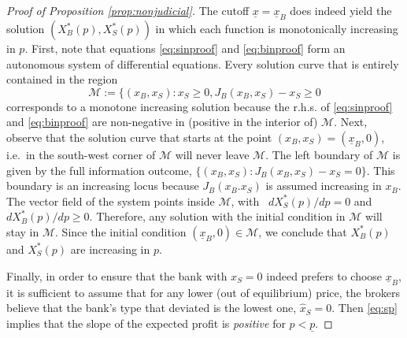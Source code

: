 \documentclass[11pt,twopage]{article}
\begin{document}
\begin{proof}[Proof of Proposition \ref{prop:nonjudicial}]
The cutoff  $\underline x = \underline x_B$ does indeed yield the solution $(X_B^*(p),X_S^*(p))$ in which each function is monotonically increasing in $p$. First, note that equations \eqref{eq:sinproof} and \eqref{eq:binproof} form an autonomous system of differential equations. Every solution curve that is entirely contained in the region \[\mathcal M := \{ (x_B,x_S): x_S\geq 0, J_B(x_B,x_S) - x_S \geq 0   \] corresponds to a monotone increasing solution because the r.h.s. of \eqref{eq:sinproof} and \eqref{eq:binproof} are non-negative in (positive in the interior of) $\mathcal M$. Next, observe that the solution curve that starts at the point $(x_B,x_S) = (\underline x_B,0)$, i.e.\ in the south-west corner of $\mathcal M$ will never leave $\mathcal M$. The left boundary of $\mathcal M$ is given by the full information outcome, $\{ (x_B,x_S):  J_B(x_B,x_S) - x_S = 0 \}$. This boundary is an increasing locus because $J_B(x_B.x_S)$ is assumed increasing in $x_B$. The vector field of the system points inside $\mathcal M$, with \ $dX_S^*(p)/dp = 0$ and $dX_B^*(p)/dp \geq 0$. Therefore, any solution with the initial condition in $\mathcal M$ will stay in $\mathcal M$. Since the initial condition $(\underline x_B, 0) \in \mathcal M$, we conclude that $X_B^*(p)$ and $X_S^*(p)$ are increasing in $p$.
%
%
%


Finally, in order to ensure that the bank with $x_S = 0$ indeed prefers to choose $\underline x_B$, it is sufficient to assume that for any lower (out of equilibrium) price, the brokers believe that the bank's type that deviated is the lowest one, $\hat x_S = 0$. Then \eqref{eq:sp} implies that the slope of the expected profit is \emph{positive} for $p < \underline p$.


\end{proof}
\end{document}
